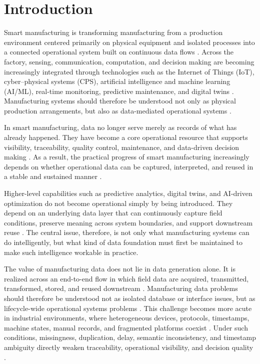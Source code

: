 \documentclass[systems,article,accept,pdftex,moreauthors]{Definitions/mdpi}
\begin{document}
\section{Introduction}
\label{sec:introduction}

Smart manufacturing is transforming manufacturing from a production environment centered primarily on physical equipment and isolated processes into a connected operational system built on continuous data flows \cite{song2025smart,tao2018datadriven}. Across the factory, sensing, communication, computation, and decision making are becoming increasingly integrated through technologies such as the Internet of Things (IoT), cyber--physical systems (CPS), artificial intelligence and machine learning (AI/ML), real-time monitoring, predictive maintenance, and digital twins \cite{tao2017digital,ding2019digital,nguyen2025aidriven}. Manufacturing systems should therefore be understood not only as physical production arrangements, but also as data-mediated operational systems \cite{cerquitelli2021manufacturing}.

In smart manufacturing, data no longer serve merely as records of what has already happened. They have become a core operational resource that supports visibility, traceability, quality control, maintenance, and data-driven decision making \cite{ren2019bigdata,tao2018datadriven}. As a result, the practical progress  of smart manufacturing increasingly depends on whether operational data can be captured, interpreted, and reused in a stable and sustained manner \cite{bernstein2018contextualising}.

Higher-level capabilities such as predictive analytics, digital twins, and AI-driven optimization do not become operational simply by being introduced. They depend on an underlying data layer that can continuously capture field conditions, preserve meaning across system boundaries, and support downstream reuse \cite{walton2024unified,zaborowski2024role}. The central issue, therefore, is not only what manufacturing systems can do intelligently, but what kind of data foundation must first be maintained to make such intelligence workable in practice.

The value of manufacturing data does not lie in data generation alone. It is realized across an end-to-end flow in which field data are acquired, transmitted, transformed, stored, and reused downstream \cite{ismail2019manufacturing,raptis2019data}. Manufacturing data problems should therefore be understood not as isolated database or interface issues, but as lifecycle-wide operational systems problems \cite{hedberg2017lift}. This challenge becomes more acute in industrial environments, where heterogeneous devices, protocols, timestamps, machine states, manual records, and fragmented platforms coexist \cite{zeid2019interoperability,pereira2021towards}. Under such conditions, missingness, duplication, delay, semantic inconsistency, and timestamp ambiguity directly weaken traceability, operational visibility, and decision quality \cite{morris2020foundations,foidl2024pipeline}.
\end{document}

